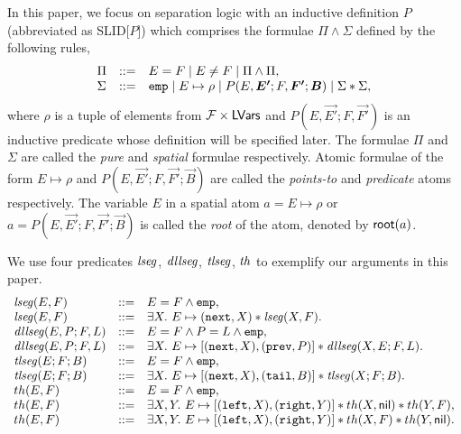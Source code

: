 \documentclass{llncs}
\begin{document}
In this paper, we focus on separation logic with an inductive definition $P$ (abbreviated as SLID[$P$]) which comprises the formulae $\Pi \wedge \Sigma$ defined by the following rules,
\[
\begin{array}{l c l}
\Pi &::=& E = F \mid E \neq F \mid \Pi \wedge \Pi,\\
\Sigma & ::=& \slemp\mid  E \mapsto \rho \mid P(E,\vec{E'}; F, \vec{F'}; \vec{B}) \mid \Sigma * \Sigma,
\end{array}
\]
where $\rho$ is a tuple of elements from $\mathcal{F} \times \mathsf{LVars}$ and $P(E,\vec{E'}; F, \vec{F'})$ is an inductive predicate whose definition will be specified later. The formulae $\Pi$ and $\Sigma$ are called the \emph{pure} and \emph{spatial} formulae respectively. Atomic formulae of the form $E \mapsto \rho$ and $P(E,\vec{E'}; F, \vec{F'}; \vec{B})$ are called the \emph{points-to} and \emph{predicate} atoms respectively. The variable $E$ in a spatial atom $a=E \mapsto \rho$ or $a=P(E,\vec{E'}; F, \vec{F'}; \vec{B})$ is called the \emph{root} of the atom, denoted by $\mathsf{root}(a)$.


\begin{example}
We use four predicates $\mathit{lseg}$, $\mathit{dllseg}$, $\mathit{tlseg}$, $\mathit{th}$ to exemplify our arguments in this paper.
\[
\begin{array}{l c l }
\lseg(E,F) & ::= & E = F \wedge \slemp, \\
\lseg(E,F) & ::= & \exists X.\ E \mapsto (\fnext,X) * \lseg(X, F).\\
%
\dllseg(E,P; F, L) & ::= & E = F \wedge P = L \wedge \slemp, \\
\dllseg(E,P; F, L) & ::= & \exists X.\ E \mapsto [(\fnext,X), (\fprev, P)] * \dllseg(X,E; F, L ).\\
%
\tlseg(E; F; B) & ::= & E = F \wedge  \slemp, \\
\tlseg(E; F; B) & ::= & \exists X.\ E \mapsto [(\fnext,X), (\ftail, B)] * \tlseg(X; F; B).\\
%
th(E,F) & ::=  & E = F \wedge \slemp, \\
th(E,F) & ::=  & \exists X, Y.\ E \mapsto [(\slleft,X), (\slright, Y)] * th(X, \nil) * th(Y, F), \\
th(E,F) & ::=  & \exists X, Y.\ E \mapsto [(\slleft,X), (\slright, Y)] * th(X, F) * th(Y, \nil).\\
%
\end{array}
\]

\end{example}
\end{document}
